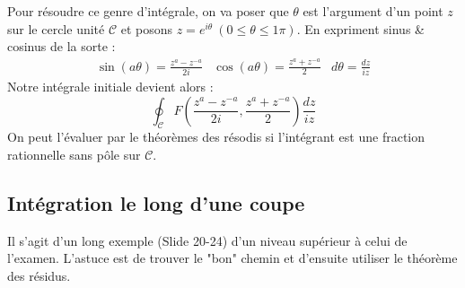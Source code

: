 	Pour résoudre ce genre d'intégrale, on va poser que $\theta$ est l'argument d'un 
	point $z$ sur le cercle unité $\mathcal{C}$ et posons $z=e^{i\theta}\ (0\leq \theta
	\leq 1\pi)$. 
	En expriment sinus \& cosinus de la sorte :
	\begin{equation}
	\begin{array}{ccc}
	\sin(a\theta) = \frac{z^a-z^{-a}}{2i} & \cos(a\theta) = \frac{z^a+z^{-a}}{2} & d\theta
	= \frac{dz}{iz}
	\end{array}
	\end{equation}
	Notre intégrale initiale devient alors :
	\begin{equation}
	\oint_\mathcal{C}F\left(\frac{z^a-z^{-a}}{2i}, \frac{z^a+z^{-a}}{2} \right)\frac{dz}
	{iz}
	\end{equation}
	On peut l'évaluer par le théorèmes des résodis si l'intégrant est une fraction 
	rationnelle sans pôle sur $\mathcal{C}$.
	
	\subsection{Intégration le long d'une coupe}
	Il s'agit d'un long exemple (Slide 20-24) d'un niveau supérieur à celui de l'examen.
	L'astuce est de trouver le "bon" chemin et d'ensuite utiliser le théorème des 
	résidus.


